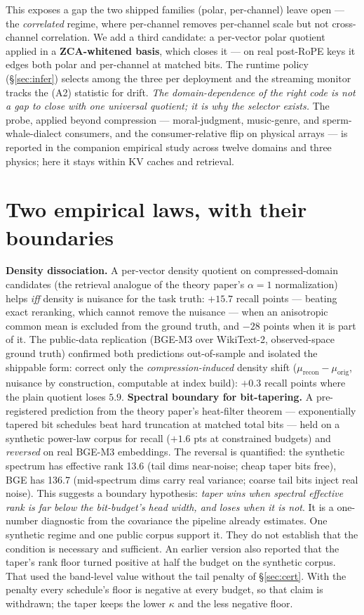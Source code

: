 \documentclass[11pt]{article}
\begin{document}
This exposes a gap the two shipped families (polar, per-channel) leave open --- the
\emph{correlated} regime, where per-channel removes per-channel scale but not
cross-channel correlation. We add a third candidate: a per-vector polar quotient
applied in a \textbf{ZCA-whitened basis}, which closes it --- on real post-RoPE keys
it edges both polar and per-channel at matched bits. The runtime policy
(\S\ref{sec:infer}) selects among the three per deployment and the streaming
monitor tracks the (A2) statistic for drift. \emph{The domain-dependence of the
right code is not a gap to close with one universal quotient; it is why the
selector exists.} The probe, applied beyond compression --- moral-judgment,
music-genre, and sperm-whale-dialect consumers, and the consumer-relative flip on
physical arrays --- is reported in the companion empirical study across twelve
domains and three physics; here it stays within KV caches and retrieval.

\section{Two empirical laws, with their boundaries}\label{sec:laws}
\textbf{Density dissociation.} A per-vector density quotient on
compressed-domain candidates (the retrieval analogue of the theory paper's
$\alpha{=}1$ normalization) helps \emph{iff} density is nuisance for the task
truth: $+15.7$ recall points --- beating exact reranking, which cannot remove
the nuisance --- when an anisotropic common mean is excluded from the ground
truth, and $-28$ points when it is part of it. The public-data replication
(BGE-M3 over WikiText-2, observed-space ground truth) confirmed both
predictions out-of-sample and isolated the shippable form: correct only the
\emph{compression-induced} density shift ($\mu_{\text{recon}} -
\mu_{\text{orig}}$, nuisance by construction, computable at index build):
$+0.3$ recall points where the plain quotient loses $5.9$.
\textbf{Spectral boundary for bit-tapering.} A pre-registered prediction from
the theory paper's heat-filter theorem --- exponentially tapered bit
schedules beat hard truncation at matched total bits --- held on a synthetic
power-law corpus for recall ($+1.6$ pts at constrained budgets) and
\emph{reversed} on real
BGE-M3 embeddings. The reversal is quantified: the synthetic spectrum has
effective rank 13.6 (tail dims near-noise; cheap taper bits free), BGE has
136.7 (mid-spectrum dims carry real variance; coarse tail bits inject real
noise). This suggests a boundary hypothesis: \emph{taper wins when spectral
effective rank is far below the bit-budget's head width, and loses when it is
not}. It is a one-number diagnostic from the covariance the pipeline already
estimates. One synthetic regime and one public corpus support it. They do not
establish that the condition is necessary and sufficient. An earlier version
also reported that the taper's rank floor turned positive at half the budget on
the synthetic corpus. That used the band-level value without the tail penalty of
\S\ref{sec:cert}. With the penalty every schedule's floor is negative at every
budget, so that claim is withdrawn; the taper keeps the lower $\kappa$ and the
less negative floor.
\end{document}
